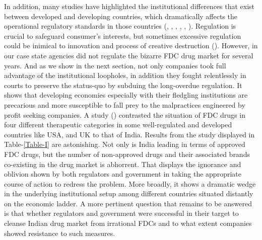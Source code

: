 \documentclass[AER]{AEA}
\theoremstyle{theorem}
\begin{document}
In addition, many studies have highlighted the institutional differences that exist between developed and developing countries, which dramatically affects the operational regulatory standards in those countries (\cite{banerjee1997theory}, \cite{bertrand2007obtaining}, \cite{fisman2004tax}, \cite{acemoglu2005unbundling}, \cite{acemoglu2005institutions}, \cite{acemoglu2006simple}). Regulation is crucial to safeguard consumer's interests, but sometimes excessive regulation could be inimical to innovation and process of creative destruction (\cite{aghion2021impact}). However, in our case state agencies did not regulate the bizarre FDC drug market for several years. And as we show in the next section, not only companies took full advantage of the institutional loopholes, in addition they fought relentlessly in courts to preserve the status-quo by subduing the long-overdue regulation. It shows that developing economies especially with their fledgling institutions are precarious and more susceptible to fall prey to the malpractices engineered by profit seeking companies. A study (\cite{mcgettigan2015use}) contrasted the situation of FDC drugs in four different therapeutic categories in some well-regulated and developed countries like USA, and UK to that of India. Results from the study displayed in Table-\ref{Table-I} are astonishing. Not only is India leading in terms of approved FDC drugs, but the number of non-approved drugs and their associated brands co-existing in the drug market is abhorrent. That displays the ignorance and oblivion shown by both regulators and government in taking the appropriate course of action to redress the problem. More broadly, it shows a dramatic wedge in the underlying institutional setup among different countries situated distantly on the economic ladder. A more pertinent question that remains to be answered is that whether regulators and government were successful in their target to cleanse Indian drug market from irrational FDCs and to what extent companies showed resistance to such measures.
\end{document}
